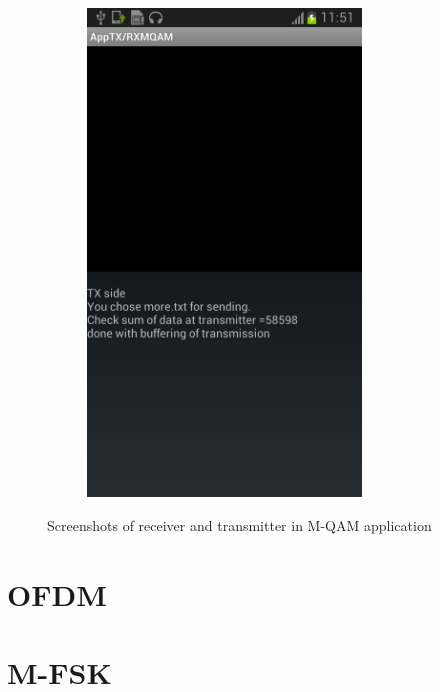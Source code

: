 \documentclass[12pt,a4paper,openright]{report}
\begin{document}
\begin{figure}[H]
\begin{subfigure}{.5\textwidth}
      \includegraphics[width=0.8\textwidth]{20140508Transmittermoreexample.png}
      \label{fig:20140508Transmittermoreexample}
   \end{subfigure}
\caption[Screenshots of receiver and transmitter in M-QAM application]{Screenshots of receiver and transmitter in M-QAM application}
 \end{figure} 

\section{OFDM}

\section{M-FSK}
\end{document}
